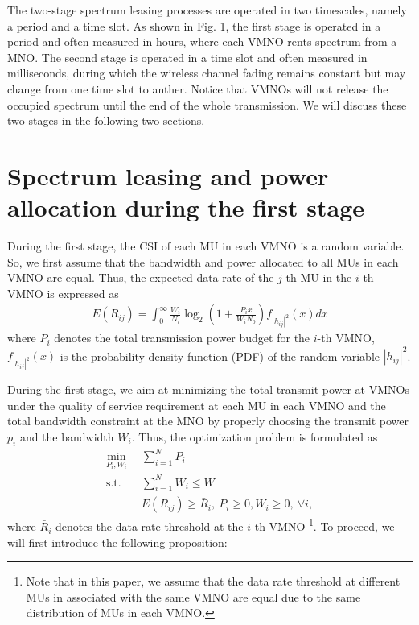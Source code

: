 \documentclass[journal]{IEEEtran}
\begin{document}
The two-stage spectrum leasing processes are operated in two timescales, namely a period and a time slot. As shown in Fig. 1, the first stage is operated in a period and often measured in hours, where each VMNO rents spectrum from a MNO. The second stage is operated in a time slot and often measured in milliseconds, during which the  wireless channel fading remains constant but may change from one time slot to anther. Notice that VMNOs will not release the occupied spectrum until the end of the whole transmission. We will discuss these two stages in the following two sections.

\section{Spectrum leasing and power allocation during the first stage}

During the first stage, the CSI of each MU in each VMNO is a random variable. So, we first assume that the bandwidth and power allocated to all MUs in each VMNO are equal. Thus, the expected data rate of the $j$-th MU in the $i$-th VMNO is expressed as
\begin{align}
E\left({R}_{ij}\right) = \int_{0}^{\infty} \frac{W_i}{N_i} \log_2\left(1 + \frac{P_i x}{W_i N_0}\right) f_{\left|h_{ij} \right|^2} \left(x\right)dx
\end{align}
where $P_i$ denotes the total transmission power budget for the $i$-th VMNO, $f_{\left|h_{ij} \right|^2} \left(x\right)$ is the probability density function (PDF) of the random variable $\left|h_{ij} \right|^2$. 

During the first stage, we aim at minimizing the total transmit power at VMNOs under the quality of service requirement at each MU in each VMNO and the total bandwidth constraint at the MNO by properly choosing the transmit power $p_i$ and the bandwidth $W_i$. Thus, the optimization problem is formulated as
\begin{subequations}\label{q4}
	\begin{align}
	\min_{P_i, W_i}\ & \sum\limits_{i = 1}^{N} P_i \\ \mbox{s.t.} \quad &  \sum\limits_{i = 1}^{N} W_i \leq W\\ \quad &  E\left({R}_{ij}\right) \geq \bar{R}_i, \ P_i \geq 0, W_i \geq 0, \ \forall i, 
	\end{align}
\end{subequations}
where $\bar{R}_i$ denotes the data rate threshold at the $i$-th VMNO  \footnote{Note that in this paper, we assume that the data rate threshold at different MUs in associated with the same VMNO are equal due to the same distribution of MUs in each VMNO.}. To proceed, we will first introduce the following proposition:
\end{document}
